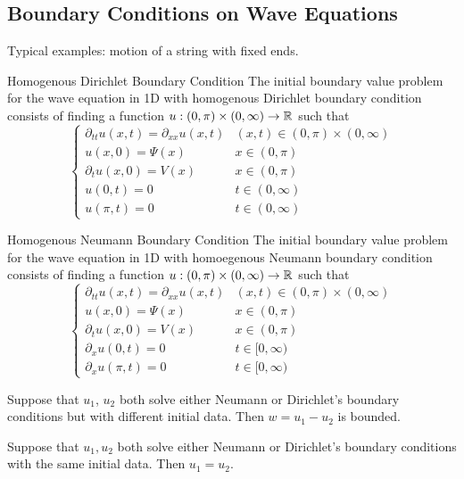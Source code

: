 \documentclass[a4paper]{article}
\begin{document}
\subsection{Boundary Conditions on Wave Equations}
Typical examples: motion of a string with fixed ends. 
\begin{defn}{Homogenous Dirichlet Boundary Condition}{} The initial boundary value problem for the wave equation in 1D with homogenous Dirichlet boundary condition consists of finding a function $u:(0,\pi)\times(0,\infty)\to\mathbb{R}$ such that 
$$\begin{cases}
\partial_{tt}u(x,t)=\partial_{xx}u(x,t) & (x,t)\in(0,\pi)\times(0,\infty)\\
u(x,0)=\Psi(x) & x\in(0,\pi)\\
\partial_tu(x,0)=V(x) & x\in(0,\pi)\\
u(0,t)=0 & t\in(0,\infty)\\
u(\pi,t)=0 & t\in(0,\infty)
\end{cases}$$
\end{defn}

\begin{defn}{Homogenous Neumann Boundary Condition}{} The initial boundary value problem for the wave equation in 1D with homoegenous Neumann boundary condition consists of finding a function $u:(0,\pi)\times(0,\infty)\to\mathbb{R}$ such that $$\begin{cases}
\partial_{tt}u(x,t)=\partial_{xx}u(x,t) & (x,t)\in(0,\pi)\times(0,\infty)\\
u(x,0)=\Psi(x) & x\in(0,\pi)\\
\partial_tu(x,0)=V(x) & x\in(0,\pi)\\
\partial_xu(0,t)=0 & t\in[0,\infty)\\
\partial_xu(\pi,t)=0 & t\in[0,\infty)
\end{cases}$$
\end{defn}

\begin{prp}{}{} Suppose that $u_1$, $u_2$ both solve either Neumann or Dirichlet's boundary conditions but with different initial data. Then $w=u_1-u_2$ is bounded. 
\end{prp}

\begin{lmm}{}{} Suppose that $u_1,u_2$ both solve either Neumann or Dirichlet's boundary conditions with the same initial data. Then $u_1=u_2$. 
\end{lmm}
\end{document}
